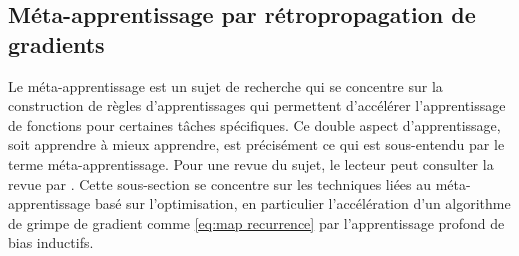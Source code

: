 




\subsection{Méta-apprentissage par rétropropagation de gradients}

Le méta-apprentissage est un sujet de recherche qui se concentre sur la construction de règles d'apprentissages qui permettent 
d'accélérer l'apprentissage de fonctions pour certaines tâches spécifiques. Ce double aspect d'apprentissage, soit apprendre à mieux 
apprendre, est précisément ce qui est sous-entendu par le terme méta-apprentissage. Pour une revue du sujet, le lecteur peut consulter 
la revue par \citet{Hospedales2020}. Cette sous-section se concentre sur les techniques liées au méta-apprentissage basé sur l'optimisation, 
en particulier l'accélération d'un algorithme de grimpe de gradient comme \eqref{eq:map recurrence} par l'apprentissage profond de bias inductifs.



